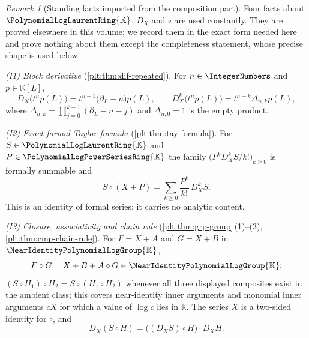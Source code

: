 \documentclass[11pt,oneside]{article}
\theoremstyle{plain}
\theoremstyle{definition}
\theoremstyle{remark}
\newtheorem{remark}[theorem]{Remark}
\newcommand{\K}{\mathbb{K}}
\newcommand{\PLpow}{\PolynomialLogPowerSeriesRing{\K}}   %
\newcommand{\PLlau}{\PolynomialLogLaurentRing{\K}}       %
\newcommand{\Gnear}{\NearIdentityPolynomialLogGroup{\K}} %
\newcommand{\DX}{D_{X}}                                  %
\newcommand{\shiftop}[2]{\Delta_{#1,#2}}                 %
\newcommand{\compose}{\mathbin{\circ}}
\begin{document}
\begin{remark}[Standing facts imported from the composition part]
\label{plt:rmk:rev-imports}
Four facts about \(\PLlau\), \(\DX\) and \(\compose\) are used constantly.
They are proved elsewhere in this volume; we record them in the exact form
needed here and prove nothing about them except the completeness statement,
whose precise shape is used below.

\emph{(I1) Block derivative} (\cref{plt:thm:dif-repeated}).  For \(n\in\IntegerNumbers\) and \(p\in\K[L]\),
\begin{equation}\label{plt:eq:rev-block-derivative}
 \DX\bigl(t^np(L)\bigr)=t^{n+1}\bigl(\partial_L-n\bigr)p(L),
 \qquad
 \DX^k\bigl(t^np(L)\bigr)=t^{n+k}\shiftop{n}{k}p(L),
\end{equation}
where \(\shiftop{n}{k}=\prod_{j=0}^{k-1}(\partial_L-n-j)\) and
\(\shiftop{n}{0}=1\) is the empty product.

\emph{(I2) Exact formal Taylor formula} (\cref{plt:thm:tay-formula}).  For \(S\in\PLlau\) and
\(P\in\PLpow\) the family \(\bigl(P^k\DX^kS/k!\bigr)_{k\ge0}\) is formally
summable and
\begin{equation}\label{plt:eq:rev-taylor}
 S\compose(X+P)=\sum_{k\ge0}\frac{P^k}{k!}\,\DX^kS .
\end{equation}
This is an identity of formal series; it carries no analytic content.

\emph{(I3) Closure, associativity and chain rule}
(\cref{plt:thm:grp-group}\,(1)--(3), \cref{plt:thm:cmp-chain-rule}).  For
\(F=X+A\) and \(G=X+B\) in \(\Gnear\),
\begin{equation}\label{plt:eq:rev-closure}
 F\compose G=X+B+A\compose G\in\Gnear ;
\end{equation}
\((S\compose H_1)\compose H_2
=S\compose(H_1\compose H_2)\) whenever all three displayed composites exist in
the ambient class; this covers near-identity inner arguments and monomial
inner arguments \(cX\) for which a value of \(\log c\) lies in \(\K\).  The
series \(X\) is a two-sided identity for \(\compose\), and
\begin{equation}\label{plt:eq:rev-chain-rule}
 \DX(S\compose H)=\bigl((\DX S)\compose H\bigr)\cdot\DX H .
\end{equation}


\end{remark}
\end{document}
